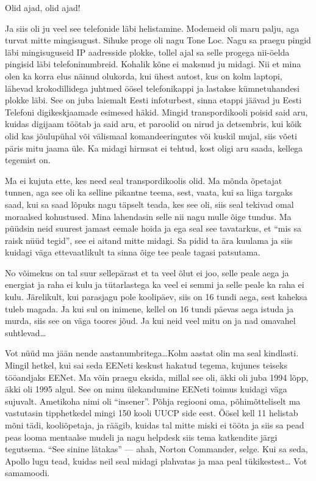 Olid ajad, olid ajad!

Ja siis oli ju veel see telefonide läbi helistamine. Modemeid oli maru palju, aga turvat mitte mingisugust. Sihuke proge oli nagu Tone Loc. Nagu sa praegu pingid läbi mingisuguseid IP aadresside plokke, tollel ajal sa selle progega nii-öelda pingisid läbi telefoninumbreid.  Kohalik kõne ei maksnud ju midagi. Nii et mina olen ka korra elus näinud olukorda, kui  ühest autost, kus on kolm laptopi, lähevad krokodillidega juhtmed öösel telefonikappi ja  lastakse kümnetuhandesi plokke läbi. See on juba laiemalt  Eesti infoturbest, sinna etappi jäävad ju Eesti Telefoni digikeskjaamade esimesed häkid. Mingid transpordikooli poisid said aru, kuidas digijaam töötab ja said aru, et paroolid on nirud ja detsembris,  kui kõik olid kas jõulupühal või välismaal komandeeringutes või kuskil mujal, siis võeti päris mitu jaama üle. Ka midagi hirmsat ei tehtud, kost oligi aru saada, kellega tegemist on. 


Ma ei kujuta ette, kes need seal transpordikoolis olid. Ma mõnda õpetajat tunnen, aga see oli ka selline pikantne teema, sest, vaata, kui sa liiga targaks saad, kui sa saad lõpuks nagu täpselt teada, kes see oli, siis seal tekivad omal moraalsed kohustused. Mina lahendasin selle nii nagu mulle õige tundus. Ma püüdsin neid suurest jamast eemale hoida ja ega seal see tavatarkus, et \enquote{mis sa raisk nüüd tegid}, see ei aitand mitte midagi.  Sa pidid ta ära kuulama ja siis kuidagi väga ettevaatlikult ta sinna õige tee peale tagasi patsutama. 


No võimekus on tal suur sellepärast et ta veel õlut ei joo, selle peale aega ja energiat ja raha ei kulu ja tütarlastega ka veel ei semmi ja selle peale ka raha ei kulu. Järelikult, kui parasjagu pole koolipäev, siis on 16 tundi aega, sest kaheksa tuleb magada. Ja kui sul on inimene, kellel on 16 tundi päevas aega istuda ja murda, siis see on väga toores jõud. Ja kui neid veel mitu on ja nad omavahel suhtlevad\ldots


Vot nüüd ma jään nende aastanumbritega\ldots Kolm aastat olin ma seal kindlasti. Mingil hetkel, kui sai seda EENeti keskust hakatud tegema, kujunes teiseks tööandjaks EENet. Ma võin praegu eksida, millal see oli, äkki oli juba 1994 lõpp, äkki oli 1995 algul. See on minu ülekandumine EENeti toimus kuidagi väga sujuvalt. Ametikoha nimi oli \enquote{insener}. Põhja regiooni oma, põhimõtteliselt ma vastutasin  tipphetkedel mingi 150 kooli UUCP side eest. Öösel kell 11 helistab mõni tädi,  kooliõpetaja, ja räägib, kuidas tal mitte miski ei tööta ja  siis sa pead peas looma mentaalse mudeli ja nagu helpdesk siis tema katkendite järgi tegutsema. \enquote{See sinine lätakas} --- ahah, Norton Commander, selge. Kui sa seda, Apollo lugu tead, kuidas neil seal midagi plahvatas ja maa peal tükikestest\ldots {} Vot samamoodi. 


